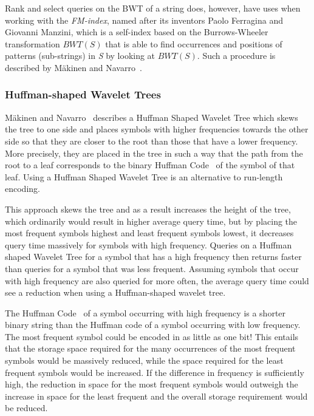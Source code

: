 Rank and select queries on the BWT of a string does, however, have uses when working with the \textit{FM-index}, named after its inventors Paolo Ferragina and Giovanni Manzini, which is a self-index based on the Burrows-Wheeler transformation $BWT(S)$ that is able to find occurrences and positions of patterns (sub-strings) in \textit{S} by looking at $BWT(S)$. 
Such a procedure is described by Mäkinen and Navarro~\citep[Section 2]{FMcountOnBWT}.

\subsubsection{Huffman-shaped Wavelet Trees}
\label{sec:huffmanShapedWaveletTree}
Mäkinen and Navarro~\citep[Section~4]{FMcountOnBWT} describes a Huffman Shaped Wavelet Tree which skews the tree to one side and places symbols with higher frequencies towards the other side so that they are closer to the root than those that have a lower frequency.
More precisely, they are placed in the tree in such a way that the path from the root to a leaf corresponds to the binary Huffman Code~\citep[Introduction]{HuffmanCoding} of the symbol of that leaf.
Using a Huffman Shaped Wavelet Tree is an alternative to run-length encoding.

This approach skews the tree and as a result increases the height of the tree, which ordinarily would result in higher average query time, but by placing the most frequent symbols highest and least frequent symbols lowest, it decreases query time massively for symbols with high frequency.
Queries on a Huffman shaped Wavelet Tree for a symbol that has a high frequency then returns faster than queries for a symbol that was less frequent.
Assuming symbols that occur with high frequency are also queried for more often, the average query time could see a reduction when using a Huffman-shaped wavelet tree.

The Huffman Code~\citep[Introduction]{HuffmanCoding} of a symbol occurring with high frequency is a shorter binary string than the Huffman code of a symbol occurring with low frequency.
The most frequent symbol could be encoded in as little as one bit!
This entails that the storage space required for the many occurrences of the most frequent symbols would be massively reduced, while the space required for the least frequent symbols would be increased.
If the difference in frequency is sufficiently high, the reduction in space for the most frequent symbols would outweigh the increase in space for the least frequent and the overall storage requirement would be reduced.

